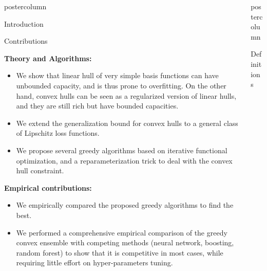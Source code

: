 \documentclass{beamer}
\newlength{\columnheight}
\begin{document}
\begin{frame}
\begin{columns}
\begin{column}{.23\textwidth}
\begin{beamercolorbox}[center]{postercolumn}
\begin{minipage}{.98\textwidth}
{\begin{myblock}{Introduction}
\end{myblock}\vfill

\vspace{-0.2em}
\begin{myblock}{Contributions}

\textbf{{\color{blue}Theory and Algorithms:}}  
\begin{itemize}
\setlength\itemsep{0.1em}
	\item We show that linear hull of very simple basis functions can have unbounded capacity, and is thus prone to overfitting. On the other hand, convex hulls can be seen as a regularized version of linear hulls, and they are still rich but have bounded capacities.
	\item We extend the generalization bound for convex hulls to a general class of Lipschitz loss functions.
	\item We propose several greedy algorithms based on iterative functional optimization, and a reparameterization trick to deal with the convex hull constraint.
\end{itemize}

\vspace{0.2em}
\textbf{{\color{blue}Empirical contributions:}}  
\begin{itemize}
\setlength\itemsep{0.1em}
	\item We empirically compared the proposed greedy algorithms to find the best.
	\item We performed a comprehensive empirical comparison of the greedy convex ensemble with competing methods (neural network, boosting, random forest) to show that it is competitive in most cases, while requiring little effort on hyper-parameters tuning.
\end{itemize}
\end{myblock}\vfill

}\end{minipage}\end{beamercolorbox}

\end{column}

\begin{column}{.37\textwidth}
\begin{beamercolorbox}[center]{postercolumn}
\begin{minipage}{.98\textwidth} %
\parbox[t][\columnheight]{\textwidth}{ 

\begin{myblock}{Definitions}


\end{myblock}}
\end{minipage}
\end{beamercolorbox}
\end{column}
\end{columns}
\end{frame}
\end{document}
